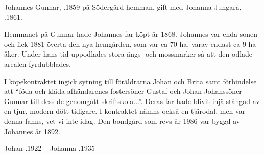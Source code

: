 Johannes Gunnar, .1859 på Södergård hemman, gift med Johanna Jungarå, .1861.
\begin{jhchildren}
  \item {}
  \item {}
  \item {}
  \item {}
  \item {}
  \item {}
  \item {}
  \item {}
  \item {}
  \item {}
  \item {}
  \item {}
\end{jhchildren}
Hemmanet på Gunnar hade Johannes far köpt år 1868. Johannes var enda sonen och fick 1881 överta den nya hemgården, som var ca 70 ha, varav endast ca 9 ha åker. Under hans tid uppodlades stora ängs- och mossmarker så att den odlade arealen fyrdubblades.

I köpekontraktet ingick sytning till föräldrarna Johan och Brita samt förbindelse att ``föda och kläda afhändarenes fostersöner Gustaf och Johan Johanssöner Gunnar till dess de genomgått skriftskola...''. Deras far hade blivit ihjälstångad av en tjur, modern dött tidigare. I kontraktet nämns också en tjärodal, men var denna fanns, vet vi inte idag. Den bondgård som revs år 1986 var byggd av Johannes  år 1892.

Johan .1922  --  Johanna .1935


